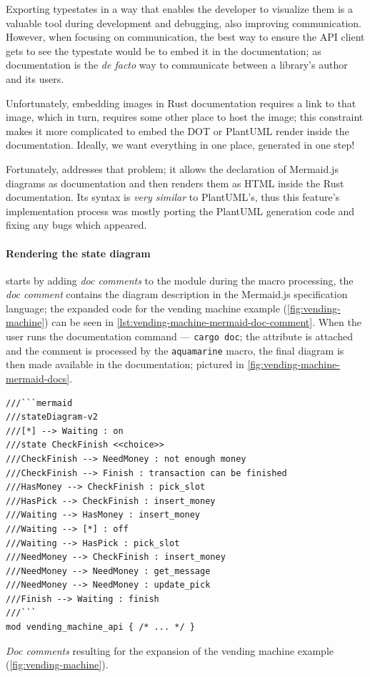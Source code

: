 Exporting typestates in a way that enables the developer to visualize them is a valuable tool during development and debugging, also improving communication.
However, when focusing on communication, the best way to ensure the \gls{API} client gets to see the typestate would be to embed it in the documentation;
as documentation is the \emph{de facto} way to communicate between a library's author and its users.

Unfortunately, embedding images in Rust documentation requires a link to that image, which in turn, requires some other place to host the image;
this constraint makes it more complicated to embed the DOT or PlantUML render inside the documentation.
Ideally, we want everything in one place, generated in one step!

Fortunately,  addresses that problem;
it allows the declaration of Mermaid.js diagrams as documentation and then renders them as HTML inside the Rust documentation.
Its syntax is \emph{very similar} to PlantUML's,
thus this feature's implementation process was mostly porting the PlantUML generation code and fixing any bugs which appeared.

\paragraph{Rendering the state diagram} starts by adding \emph{doc comments}
to the module during the macro processing, the \emph{doc comment} contains the diagram description in the Mermaid.js specification language;
the expanded code for the vending machine example (\autoref{fig:vending-machine}) can be seen in \autoref{lst:vending-machine-mermaid-doc-comment}.
When the user runs the documentation command --- \texttt{cargo doc}; the  attribute is attached and
the comment is processed by the \texttt{aquamarine} macro, the final diagram is then made available in the documentation;
pictured in \autoref{fig:vending-machine-mermaid-docs}.

\begin{listing}
    \begin{verbatim}
///```mermaid
///stateDiagram-v2
///[*] --> Waiting : on
///state CheckFinish <<choice>>
///CheckFinish --> NeedMoney : not enough money
///CheckFinish --> Finish : transaction can be finished
///HasMoney --> CheckFinish : pick_slot
///HasPick --> CheckFinish : insert_money
///Waiting --> HasMoney : insert_money
///Waiting --> [*] : off
///Waiting --> HasPick : pick_slot
///NeedMoney --> CheckFinish : insert_money
///NeedMoney --> NeedMoney : get_message
///NeedMoney --> NeedMoney : update_pick
///Finish --> Waiting : finish
///```
mod vending_machine_api { /* ... */ }
    \end{verbatim}
    \caption{\emph{Doc comments} resulting for the expansion of the vending machine example (\autoref{fig:vending-machine}).}
    \label{lst:vending-machine-mermaid-doc-comment}
\end{listing}

